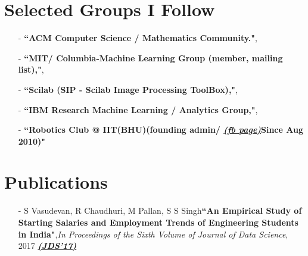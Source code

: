 \documentclass[margin,line]{res}
\begin{document}
\begin{resume}

\section{\sc Selected Groups I Follow}
\begin{itemize}
	\item[-]{\bf ``ACM Computer Science / Mathematics Community."},
	\item[-]{\bf ``MIT/ Columbia-Machine Learning Group (member, mailing list),"},
	\item[-]{\bf ``Scilab (SIP - Scilab Image Processing ToolBox),"},
	\item[-]{\bf ``IBM Research Machine Learning / Analytics Group,"},
	\item[-]{\bf ``Robotics Club @ IIT(BHU)(founding admin/ {\bf \href{http://epubs.siam.org/doi/pdf/10.1137/1.9781611973440.102}{\em (fb page)}}Since Aug 2010)"} 
\end{itemize}

\section{\sc Publications}
\begin{itemize}
\item[-]S Vasudevan, R Chaudhuri, M Pallan, S S Singh{\bf ``An Empirical Study of Starting Salaries and Employment Trends of Engineering Students in India"},{\em In Proceedings of the Sixth Volume of Journal of Data Science}, 2017 {\bf \href{http://epubs.siam.org/doi/pdf/10.1137/1.9781611973440.102}{\em (JDS'17)}}


\end{itemize}
\end{resume}
\end{document}
